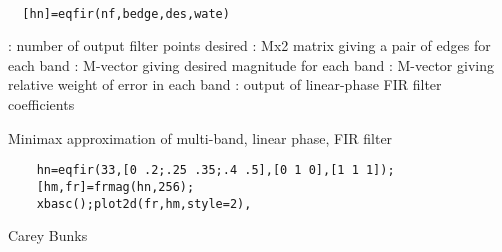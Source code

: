 
\begin{mandesc}
   \\ %
\end{mandesc}
\begin{calling_sequence}
\begin{verbatim}
  [hn]=eqfir(nf,bedge,des,wate)  
\end{verbatim}
\end{calling_sequence}
\begin{parameters}
  \begin{varlist}
    : number of output filter points desired
    : Mx2 matrix giving a pair of edges for each band
    : M-vector giving desired magnitude for each band
    : M-vector giving relative weight of error in each band
    : output of linear-phase FIR filter coefficients
  \end{varlist}
\end{parameters}
\begin{mandescription}
  Minimax approximation of multi-band, linear phase, FIR filter
\end{mandescription}
\begin{examples}
  \begin{Verbatim}
    hn=eqfir(33,[0 .2;.25 .35;.4 .5],[0 1 0],[1 1 1]);
    [hm,fr]=frmag(hn,256);
    xbasc();plot2d(fr,hm,style=2),
  \end{Verbatim}
\end{examples}
\begin{authors}
    Carey Bunks  
\end{authors}
